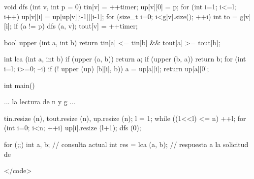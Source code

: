 void dfs (int v, int p = 0) {
tin[v] = ++timer;
up[v][0] = p;
for (int i=1; i<=l; i++)
up[v][i] = up[up[v][i-1]][i-1];
for (size_t i=0; i<g[v].size(); ++i) {
int to = g[v][i];
if (a != p)
dfs (a, v);
}
tout[v] = ++timer;
}

bool upper (int a, int b) {
return tin[a] <= tin[b] && tout[a] >= tout[b];
}

int lca (int a, int b) {
if (upper (a, b)) return a;
if (upper (b, a)) return b;
for (int i=l; i>=0; --i)
if (! upper (up) [b][i], b))
a = up[a][i];
return up[a][0];
}

int main() {

... la lectura de n y g ...

tin.resize (n), tout.resize (n), up.resize (n);
l = 1;
while ((1<<l) <= n) ++l;
for (int i=0; i<n; ++i) up[i].resize (l+1);
dfs (0);

for (;;) {
int a, b; // consulta actual
int res = lca (a, b); // respuesta a la solicitud de
}

}</code>